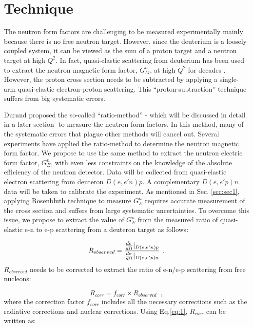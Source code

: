 \documentclass[11pt]{article}
\begin{document}
\section{Technique}
The neutron form factors are challenging to be measured experimentally mainly because there is no free neutron target. However, since the deuterium is a loosely coupled system, it can be viewed as the sum of a proton target and a neutron target at high $Q^2$. In fact, quasi-elastic scattering from deuterium has been used to extract the neutron magnetic form factor, $G_M^n$, at high $Q^2$ for decades \cite{QES1,QES2,QES3,QES4}. However, the proton cross section needs to be subtracted by applying a single-arm quasi-elastic electron-proton scattering. This \enquote{proton-subtraction} technique suffers from big systematic errors. 
\par
Durand \cite{durand} proposed the so-called \enquote{ratio-method} - which will be discussed in detail in a later section- to measure the neutron form factors. In this method, many of the systematic errors that plague other methods will cancel out. Several experiments  \cite{bonn, mainz, jlab} have applied the ratio-method to determine the neutron magnetic form factor. We propose to use the same method to extract the neutron electric form factor, $G_E^n$, with even less constraints on the knowledge of the absolute efficiency of the neutron detector. Data will be collected from quasi-elastic electron scattering from deuteron $D(e,e'n)p$. A complementary $D(e,e'p)n$ data will be taken to calibrate the experiment. 
As mentioned in Sec. \ref{sec:sec1}, applying Rosenbluth technique to measure $G_E^n$ requires accurate measurement of the cross section and suffers from large systematic uncertainties. To overcome this issue, we propose to extract the value of $G_E^n$ from the measured ratio of quasi-elastic e-n to e-p scattering from a deuteron target as follows: 

\begin{equation}
R_{observed} = \cfrac{\frac{d\sigma}{d\Omega} |_{D(e,e'n)p}}{\frac{d\sigma}{d\Omega} |_{D(e,e'p)n}} \;\; .
\end{equation}
$R_{observed}$ needs to be corrected to extract the ratio of e-n/e-p scattering from free nucleons:

\begin{equation}\label{eq:3}
R_{corr} = f_{corr} \times R_{observed} \;\; ,
\end{equation}
where the correction factor $f_{corr}$ includes all the necessary corrections such as the radiative corrections and nuclear corrections.
Using Eq.\ref{eq:1}, $R_{corr}$ can be written as: 
\end{document}

